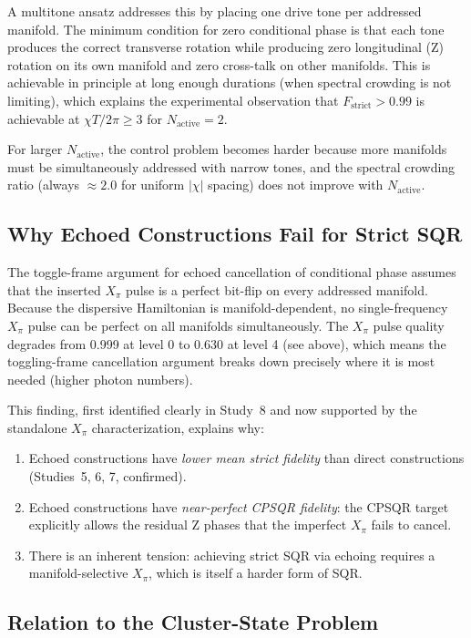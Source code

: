 \documentclass[11pt,letterpaper]{article}
\newcommand{\chiT}{\chi T / 2\pi}
\newcommand{\nact}{N_{\text{active}}}
\begin{document}
A multitone ansatz addresses this by placing one drive tone per addressed manifold.
The minimum condition for zero conditional phase is that each tone produces the correct
transverse rotation while producing zero longitudinal (Z) rotation on its own manifold
and zero cross-talk on other manifolds.  This is achievable in principle at long enough
durations (when spectral crowding is not limiting), which explains the experimental observation
that $F_\text{strict} > 0.99$ is achievable at $\chiT \ge 3$ for $\nact = 2$.

For larger $\nact$, the control problem becomes harder because more manifolds must be
simultaneously addressed with narrow tones, and the spectral crowding ratio (always
$\approx 2.0$ for uniform $|\chi|$ spacing) does not improve with $\nact$.

\subsection{Why Echoed Constructions Fail for Strict SQR}

The toggle-frame argument for echoed cancellation of conditional phase
assumes that the inserted $X_\pi$ pulse is a perfect bit-flip on every
addressed manifold.  Because the dispersive Hamiltonian is manifold-dependent,
no single-frequency $X_\pi$ pulse can be perfect on all manifolds simultaneously.
The $X_\pi$ pulse quality degrades from 0.999 at level 0 to 0.630 at level 4
(see above), which means the toggling-frame cancellation argument breaks down
precisely where it is most needed (higher photon numbers).

This finding, first identified clearly in Study~8 and now supported by the
standalone $X_\pi$ characterization, explains why:
\begin{enumerate}
\item Echoed constructions have \emph{lower mean strict fidelity} than direct
  constructions (Studies~5, 6, 7, confirmed).
\item Echoed constructions have \emph{near-perfect CPSQR fidelity}: the CPSQR
  target explicitly allows the residual Z phases that the imperfect $X_\pi$
  fails to cancel.
\item There is an inherent tension: achieving strict SQR via echoing requires a
  manifold-selective $X_\pi$, which is itself a harder form of SQR.
\end{enumerate}

\subsection{Relation to the Cluster-State Problem}
\end{document}
